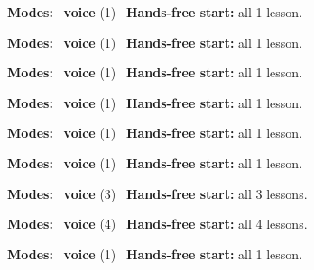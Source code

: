 \expandafter\def\csname hlchaptermodality168\endcsname{%
  {\small\noindent
    \textbf{Modes:} \hlvoicesign{}~\textbf{voice} (1)\quad
    \hlvoicesign{}~\textbf{Hands-free start:} all 1 lesson.%
    \par}\medskip
}

\expandafter\def\csname hlchaptermodality169\endcsname{%
  {\small\noindent
    \textbf{Modes:} \hlvoicesign{}~\textbf{voice} (1)\quad
    \hlvoicesign{}~\textbf{Hands-free start:} all 1 lesson.%
    \par}\medskip
}

\expandafter\def\csname hlchaptermodality170\endcsname{%
  {\small\noindent
    \textbf{Modes:} \hlvoicesign{}~\textbf{voice} (1)\quad
    \hlvoicesign{}~\textbf{Hands-free start:} all 1 lesson.%
    \par}\medskip
}

\expandafter\def\csname hlchaptermodality171\endcsname{%
  {\small\noindent
    \textbf{Modes:} \hlvoicesign{}~\textbf{voice} (1)\quad
    \hlvoicesign{}~\textbf{Hands-free start:} all 1 lesson.%
    \par}\medskip
}

\expandafter\def\csname hlchaptermodality172\endcsname{%
  {\small\noindent
    \textbf{Modes:} \hlvoicesign{}~\textbf{voice} (1)\quad
    \hlvoicesign{}~\textbf{Hands-free start:} all 1 lesson.%
    \par}\medskip
}

\expandafter\def\csname hlchaptermodality173\endcsname{%
  {\small\noindent
    \textbf{Modes:} \hlvoicesign{}~\textbf{voice} (1)\quad
    \hlvoicesign{}~\textbf{Hands-free start:} all 1 lesson.%
    \par}\medskip
}

\expandafter\def\csname hlchaptermodality174\endcsname{%
  {\small\noindent
    \textbf{Modes:} \hlvoicesign{}~\textbf{voice} (3)\quad
    \hlvoicesign{}~\textbf{Hands-free start:} all 3 lessons.%
    \par}\medskip
}

\expandafter\def\csname hlchaptermodality175\endcsname{%
  {\small\noindent
    \textbf{Modes:} \hlvoicesign{}~\textbf{voice} (4)\quad
    \hlvoicesign{}~\textbf{Hands-free start:} all 4 lessons.%
    \par}\medskip
}

\expandafter\def\csname hlchaptermodality176\endcsname{%
  {\small\noindent
    \textbf{Modes:} \hlvoicesign{}~\textbf{voice} (1)\quad
    \hlvoicesign{}~\textbf{Hands-free start:} all 1 lesson.%
    \par}\medskip
}

